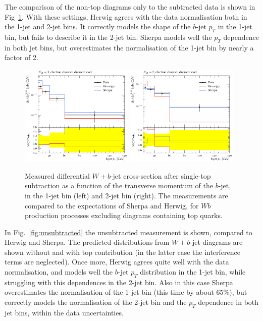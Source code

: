 \documentclass[11pt]{cernrep}
\begin{document}
The comparison of the non-top diagrams only to the subtracted data is shown in Fig~\ref{fig:subtracted}. 
With these settings, Herwig agrees with the data normalisation both in the 1-jet and 2-jet bins.
It correctly models the shape of the $b$-jet $p_T$ in the 1-jet bin, but fails to describe it in the 2-jet bin.
Sherpa models well the $p_T$ dependence in both jet bins, but overestimates the normalisation of the 1-jet bin 
by nearly a factor of 2.

\begin{figure}
\centering
	\includegraphics[width=0.48\textwidth]{subtracted_h7_s22-1jet.pdf}
	\includegraphics[width=0.48\textwidth]{subtracted_h7_s22-2jet.pdf}
\caption{\label{fig:subtracted}
  Measured differential $W+b$-jet cross-section after single-top subtraction as a function of the
  transverse momentum of the $b$-jet, in the 1-jet bin (left) and 2-jet bin (right). 
  The measurements are compared to the expectations of
  Sherpa and Herwig, for $Wb$ production processes excluding diagrams containing top quarks.}
\end{figure}

In Fig.~\ref{fig:unsubtracted} the unsubtracted measurement is shown, compared to Herwig and Sherpa.
The predicted distributions from $W+b$-jet diagrams are shown without and with top contribution (in the latter case the interference terms are neglected).
Once more, Herwig agrees quite well with the data normalisation, and models well the $b$-jet $p_T$ distribution in the 1-jet bin, 
while struggling with this dependences in the 2-jet bin. Also in this case Sherpa overestimates the normalisation of
the 1-jet bin (this time by about $65\%$), but correctly models the normalisation of the 2-jet bin
and the $p_T$ dependence in both jet bins, within the data uncertainties.
\end{document}
